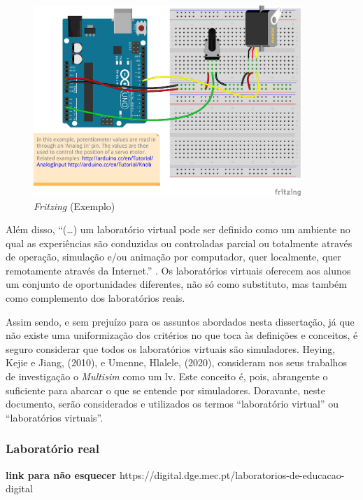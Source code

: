 \begin{figure}[hbtp]
    \centering
    \includegraphics[width=0.9\textwidth]{figures/AnalogInputToServo_bb.png}
    \caption{\textit{Fritzing} (Exemplo)}
    \label{fig:fritzing}
\end{figure}

Além disso, ``(\ldots) um laboratório virtual pode ser definido como um ambiente no qual as experiências são conduzidas ou controladas parcial ou totalmente através de operação, simulação e/ou animação por computador, quer localmente, quer remotamente através da Internet.'' \cite{EvaluatingLearningExperiencesVirtualLaboratoryHongKong}. Os laboratórios virtuais oferecem aos alunos um conjunto de oportunidades diferentes, não só como substituto, mas também como complemento dos laboratórios reais.

Assim sendo, e sem prejuízo para os assuntos abordados nesta dissertação, já que não existe uma uniformização dos critérios no que toca às definições e conceitos, é seguro considerar que todos os laboratórios virtuais são simuladores. Heying, Kejie e Jiang, (2010), \cite{multisimVLHeying} e Umenne, Hlalele, (2020), \cite{multisimVLUmenne} consideram nos seus trabalhos de investigação o \textit{Multisim}\cite{multisim} como um \acrshort{lv}. Este conceito é, pois, abrangente o suficiente para abarcar o que se entende por simuladores. Doravante, neste documento, serão considerados e utilizados os termos ``laboratório virtual'' ou ``laboratórios virtuais''.

\subsubsection{Laboratório real}
\textbf{link para não esquecer}
https://digital.dge.mec.pt/laboratorios-de-educacao-digital

